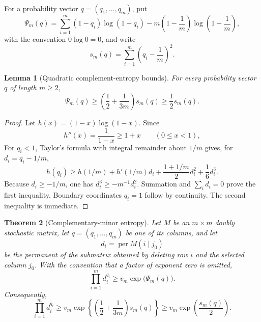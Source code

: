 \documentclass[11pt]{article}
\newtheorem{theorem}{Theorem}[section]
\newtheorem{lemma}[theorem]{Lemma}
\theoremstyle{definition}
\newcommand{\per}{\operatorname{per}}
\newcommand{\1}{\mathbf{1}}
\begin{document}
For a probability vector $q=(q_1,\dots,q_m)$, put
\begin{equation}\label{eq:Psi-definition}
 \Psi_m(q)=
 \sum_{i=1}^m(1-q_i)\log(1-q_i)
 -m\left(1-\frac1m\right)\log\left(1-\frac1m\right),
\end{equation}
with the convention $0\log0=0$, and write
\[
 s_m(q)=\sum_{i=1}^m\left(q_i-\frac1m\right)^2.
\]

\begin{lemma}[Quadratic complement-entropy bounds]\label{lem:Psi-bounds}
For every probability vector $q$ of length $m\ge2$,
\begin{equation}\label{eq:Psi-bounds}
 \Psi_m(q)\ge
 \left(\frac12+\frac1{3m}\right)s_m(q)
 \ge\frac12s_m(q).
\end{equation}
\end{lemma}

\begin{proof}
Let $h(x)=(1-x)\log(1-x)$.  Since
\[
 h''(x)=\frac1{1-x}\ge1+x
 \qquad(0\le x<1),
\]
For $q_i<1$, Taylor's formula with integral remainder about $1/m$ gives, for
$d_i=q_i-1/m$,
\[
 h(q_i)\ge h(1/m)+h'(1/m)d_i
 +\frac{1+1/m}{2}d_i^2+\frac16d_i^3.
\]
Because $d_i\ge-1/m$, one has $d_i^3\ge-m^{-1}d_i^2$.
Summation and $\sum_i d_i=0$ prove the first inequality.  Boundary
coordinates $q_i=1$ follow by continuity.  The second inequality is
immediate.
\end{proof}

\begin{theorem}[Complementary-minor entropy]\label{thm:minor-entropy}
Let $M$ be an $m\times m$ doubly stochastic matrix, let
$q=(q_1,\dots,q_m)$ be one of its columns, and let
\[
 d_i=\per M(i\mid j_0)
\]
be the permanent of the submatrix obtained by deleting row $i$ and the
selected column $j_0$.  With the convention that a factor of exponent zero
is omitted,
\begin{equation}\label{eq:minor-entropy-exact}
 \prod_{i=1}^m d_i^{q_i}
 \ge v_m\exp\bigl(\Psi_m(q)\bigr).
\end{equation}
Consequently,
\begin{equation}\label{eq:minor-entropy}
 \prod_{i=1}^m d_i^{q_i}
 \ge v_m\exp\left\{
 \left(\frac12+\frac1{3m}\right)s_m(q)
 \right\}
 \ge v_m\exp\left(\frac{s_m(q)}2\right).
\end{equation}
\end{theorem}
\end{document}
